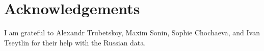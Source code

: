 \section*{Acknowledgements}
I am grateful to Alexandr Trubetskoy, Maxim Sonin, Sophie Chochaeva, and Ivan Tseytlin for their help with the Russian data.